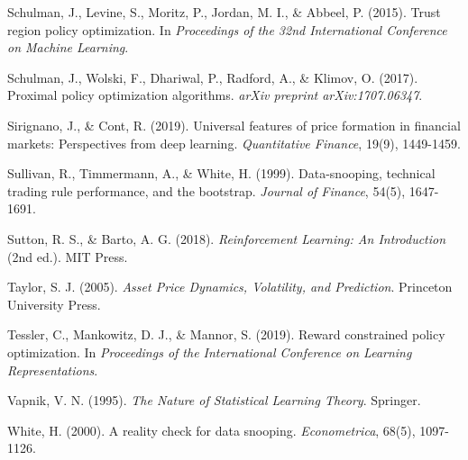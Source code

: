 \documentclass[12pt,a4paper]{article}
\begin{document}
Schulman, J., Levine, S., Moritz, P., Jordan, M. I., \& Abbeel, P. (2015). Trust region policy optimization. In \textit{Proceedings of the 32nd International Conference on Machine Learning}.

Schulman, J., Wolski, F., Dhariwal, P., Radford, A., \& Klimov, O. (2017). Proximal policy optimization algorithms. \textit{arXiv preprint arXiv:1707.06347}.

Sirignano, J., \& Cont, R. (2019). Universal features of price formation in financial markets: Perspectives from deep learning. \textit{Quantitative Finance}, 19(9), 1449-1459.

Sullivan, R., Timmermann, A., \& White, H. (1999). Data-snooping, technical trading rule performance, and the bootstrap. \textit{Journal of Finance}, 54(5), 1647-1691.

Sutton, R. S., \& Barto, A. G. (2018). \textit{Reinforcement Learning: An Introduction} (2nd ed.). MIT Press.

Taylor, S. J. (2005). \textit{Asset Price Dynamics, Volatility, and Prediction}. Princeton University Press.

Tessler, C., Mankowitz, D. J., \& Mannor, S. (2019). Reward constrained policy optimization. In \textit{Proceedings of the International Conference on Learning Representations}.

Vapnik, V. N. (1995). \textit{The Nature of Statistical Learning Theory}. Springer.

White, H. (2000). A reality check for data snooping. \textit{Econometrica}, 68(5), 1097-1126.
\end{document}
